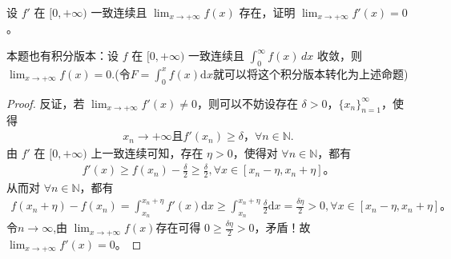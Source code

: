 \documentclass[../../main.tex]{subfiles}
\begin{document}
\begin{proposition}\label{proposition:经典导数一致连续问题}
设 $f'$ 在 $[0,+\infty)$ 一致连续且 $\lim_{x \to +\infty} f(x)$ 存在，证明 $\lim_{x \to +\infty} f'(x) = 0$。
\end{proposition}
\begin{note}
本题也有积分版本：设 $f$ 在 $[0,+\infty)$ 一致连续且 $\int_{0}^{\infty} f(x) \, dx$ 收敛，则 $\lim_{x \to +\infty} f(x) = 0$.(令$F=\int_0^x{f\left( x \right) \mathrm{d}x}$就可以将这个积分版本转化为上述命题)
\end{note}
\begin{proof}
反证，若 $\lim_{x\rightarrow +\infty} f'(x) \ne 0$，则可以不妨设存在 $\delta >0$，$\{ x_n \}_{n=1}^{\infty}$，使得
\begin{align*}
x_n\rightarrow +\infty \text{且} f'(x_n) \geqslant \delta，\forall n\in \mathbb{N}.    
\end{align*}
由 $f'$ 在 $[0,+\infty)$ 上一致连续可知，存在 $\eta >0$，使得对 $\forall n\in \mathbb{N}$，都有
\begin{align*}
f'(x) \geqslant f(x_n) -\frac{\delta}{2} \geqslant \frac{\delta}{2}, \forall x\in [x_n-\eta ,x_n+\eta] 。
\end{align*}
从而对 $\forall n\in \mathbb{N}$，都有
\begin{align*}
f(x_n+\eta) -f(x_n) =\int_{x_n}^{x_n+\eta} f'(x) \mathrm{d}x \geqslant \int_{x_n}^{x_n+\eta} \frac{\delta}{2} \mathrm{d}x = \frac{\delta \eta}{2} > 0, \forall x\in [x_n-\eta ,x_n+\eta] 。
\end{align*}
令$n\rightarrow \infty$,由 $\lim_{x\rightarrow +\infty} f(x) $存在可得 $0 \geqslant \frac{\delta \eta}{2} > 0$，矛盾！故 $\lim_{x\rightarrow +\infty} f'(x) =0$。
\end{proof}
\end{document}
